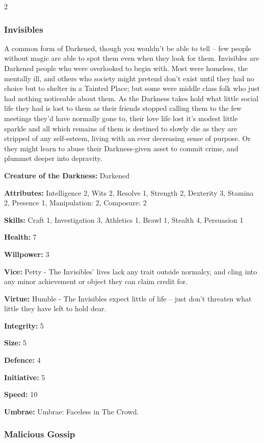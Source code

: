\begin{multicols}{2}
\subsubsection*{Invisibles}
A common form of Darkened, though you wouldn’t be able to tell – few people without magic are able to spot them even when they look for them. Invisibles are Darkened people who were overlooked to begin with. Most were homeless, the mentally ill, and others who society might pretend don't exist until they had no choice but to shelter in a Tainted Place; but some were middle class folk who just had nothing noticeable about them. As the Darkness takes hold what little social life they had is lost to them as their friends stopped calling them to the few meetings they’d have normally gone to, their love life lost it’s modest little sparkle and all which remains of them is destined to slowly die as they are stripped of any self-esteem, living with an ever decreasing sense of purpose. Or they might learn to abuse their Darkness-given asset to commit crime, and plummet deeper into depravity.

\noindent \textbf{Creature of the Darkness:} Darkened

\noindent \textbf{Attributes:} Intelligence 2, Wits 2, Resolve 1, Strength 2, Dexterity 3, Stamina 2, Presence 1, Manipulation: 2, Composure: 2

\noindent \textbf{Skills:} Craft 1, Investigation 3, Athletics 1, Brawl 1, Stealth 4, Persuasion 1

\noindent \textbf{Health:} 7

\noindent \textbf{Willpower:} 3

\noindent \textbf{Vice:} Petty - The Invisibles’ lives lack any trait outside normalcy, and cling into any minor achievement or object they can claim credit for.

\noindent \textbf{Virtue:}  Humble - The Invisibles expect little of life – just don’t threaten what little they have left to hold dear.

\noindent \textbf{Integrity:} 5

\noindent \textbf{Size:} 5

\noindent \textbf{Defence:} 4

\noindent \textbf{Initiative:} 5

\noindent \textbf{Speed:} 10

\noindent \textbf{Umbrae:} Umbrae: Faceless in The Crowd.


\subsubsection*{Malicious Gossip}


\end{multicols}
